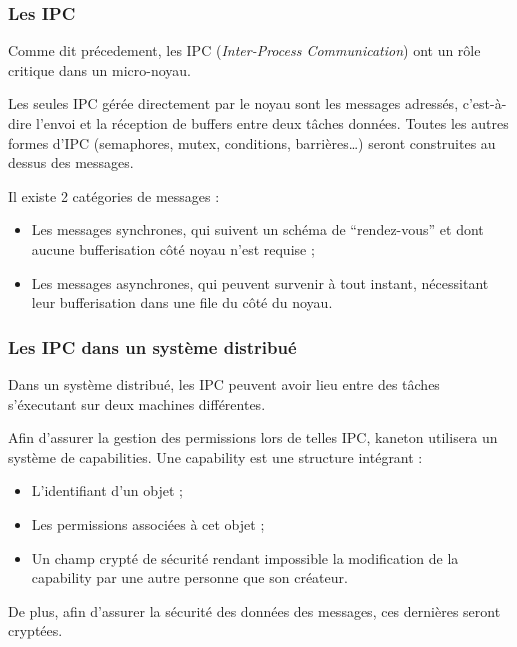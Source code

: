 \begin{frame}
  \frametitle{Les IPC}

  Comme dit pr\'{e}cedement, les IPC (\emph{Inter-Process Communication})
  ont un r\^{o}le critique dans un micro-noyau.

  \-

  Les seules IPC g\'{e}r\'{e}e directement par le noyau sont les messages
  adress\'{e}s, c'est-\`{a}-dire l'envoi et la r\'{e}ception de buffers entre deux
  t\^{a}ches donn\'{e}es. Toutes les autres formes d'IPC (semaphores, mutex,
  conditions, barri\`{e}res\ldots) seront construites au dessus des
  messages.

  \-

  Il existe 2 cat\'{e}gories de messages :

  \begin{itemize}
    \item
      Les messages synchrones, qui suivent un sch\'{e}ma de
      ``rendez-vous'' et dont aucune bufferisation c\^{o}t\'{e} noyau n'est
      requise ;
    \item
      Les messages asynchrones, qui peuvent survenir \`{a} tout instant,
      n\'{e}cessitant leur bufferisation dans une file du c\^{o}t\'{e} du noyau.
  \end{itemize}

\end{frame}


\begin{frame}
  \frametitle{Les IPC dans un syst\`{e}me distribu\'{e}}

  Dans un syst\`{e}me distribu\'{e}, les IPC peuvent avoir lieu entre
  des t\^{a}ches s'\'{e}xecutant sur deux machines diff\'{e}rentes.

  \-

  Afin d'assurer la gestion des permissions lors de telles IPC,
  kaneton utilisera un syst\`{e}me de capabilities. Une capability est une
  structure int\'{e}grant :

  \begin{itemize}
  \item
    L'identifiant d'un objet ;
  \item
    Les permissions associ\'{e}es \`{a} cet objet ;
  \item
    Un champ crypt\'{e} de s\'{e}curit\'{e} rendant impossible la modification de
  la capability par une autre personne que son cr\'{e}ateur.
  \end{itemize}

  \-

  De plus, afin d'assurer la s\'{e}curit\'{e} des donn\'{e}es des messages, ces
  derni\`{e}res seront crypt\'{e}es.

\end{frame}


